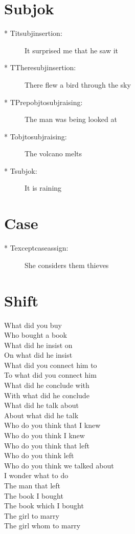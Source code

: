 \section {Subjok}
\begin{description}
\item[* Titsubjinsertion:] It surprised me that he saw it
\item[* TTheresubjinsertion:] There flew a bird through the sky
\item[* TPrepobjtosubjraising:] The man was being looked at
\item[* Tobjtosubjraising:] The volcano melts
\item[* Tsubjok:] It is raining
\end{description}
\section {Case}
\begin{description}
\item[* Texceptcaseassign:] She considers them thieves
\end{description}
\section {Shift}
What did you buy\\
Who bought a book\\
What did he insist on\\
On what did he insist\\
What did you connect him to\\
To what did you connect him\\
What did he conclude with\\
With what did he conclude\\
What did he talk about\\
About what did he talk\\
Who do you think that I knew\\
Who do you think I knew\\
Who do you think that left\\
Who do you think left\\
Who do you think we talked about\\
I wonder what to do\\
The man that left \\
The book I bought\\
The book which I bought\\
The girl to marry\\
The girl whom to marry\\
